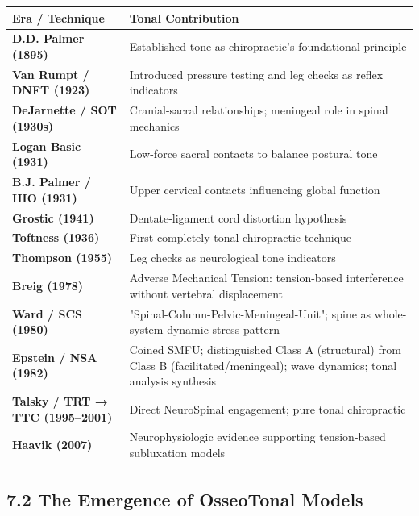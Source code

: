 \documentclass[11pt,letterpaper]{article}
\begin{document}
\begin{center}
\begin{tabular}{ll}
\toprule
\rowcolor{primaryblue}
\textbf{\textsf{\color{white}Era / Technique}} & \textbf{\textsf{\color{white}Tonal Contribution}} \\
\midrule
\rowcolor{lightbluebg!40}
\textbf{D.D. Palmer (1895)} & Established tone as chiropractic's foundational principle \\
\textbf{Van Rumpt / DNFT (1923)} & Introduced pressure testing and leg checks as reflex indicators \\
\rowcolor{lightbluebg!40}
\textbf{DeJarnette / SOT (1930s)} & Cranial-sacral relationships; meningeal role in spinal mechanics \\
\textbf{Logan Basic (1931)} & Low-force sacral contacts to balance postural tone \\
\rowcolor{lightbluebg!40}
\textbf{B.J. Palmer / HIO (1931)} & Upper cervical contacts influencing global function \\
\textbf{Grostic (1941)} & Dentate-ligament cord distortion hypothesis \\
\rowcolor{lightbluebg!40}
\textbf{Toftness (1936)} & First completely tonal chiropractic technique \\
\textbf{Thompson (1955)} & Leg checks as neurological tone indicators \\
\rowcolor{lightbluebg!40}
\textbf{Breig (1978)} & Adverse Mechanical Tension: tension-based interference without vertebral displacement \\
\textbf{Ward / SCS (1980)} & "Spinal-Column-Pelvic-Meningeal-Unit"; spine as whole-system dynamic stress pattern \\
\rowcolor{lightbluebg!40}
\textbf{Epstein / NSA (1982)} & Coined SMFU; distinguished Class A (structural) from Class B (facilitated/meningeal); wave dynamics; tonal analysis synthesis \\
\textbf{Talsky / TRT → TTC (1995–2001)} & Direct NeuroSpinal engagement; pure tonal chiropractic \\
\rowcolor{lightbluebg!40}
\textbf{Haavik (2007)} & Neurophysiologic evidence supporting tension-based subluxation models \\
\bottomrule
\end{tabular}
\end{center}


\subsection{7.2 The Emergence of OsseoTonal Models}
\end{document}
